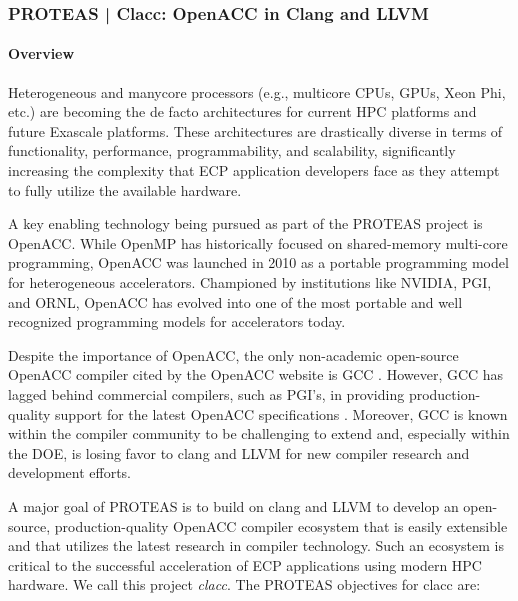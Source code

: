 \subsubsection{ PROTEAS | Clacc: OpenACC in Clang and LLVM}\label{s:clacc}

\newcommand{\todo}[1]{\textbf{\textcolor{red}{#1}}}

\paragraph{Overview}

Heterogeneous and manycore processors (e.g., multicore CPUs, GPUs, Xeon Phi,
etc.) are becoming the de facto architectures for current HPC platforms and
future Exascale platforms.  These architectures are drastically diverse in
terms of functionality, performance, programmability, and scalability,
significantly increasing the complexity that ECP application developers face
as they attempt to fully utilize the available hardware.

A key enabling technology being pursued as part of the PROTEAS project is
OpenACC.  While OpenMP has historically focused on shared-memory multi-core
programming, OpenACC was launched in 2010 as a portable programming model
for heterogeneous accelerators.  Championed by institutions like NVIDIA,
PGI, and ORNL, OpenACC has evolved into one of the most portable and well
recognized programming models for accelerators today.

Despite the importance of OpenACC, the only non-academic open-source OpenACC
compiler cited by the OpenACC website is GCC \cite{openaccOrgTools}.
However, GCC has lagged behind commercial compilers, such as PGI's, in
providing production-quality support for the latest OpenACC specifications
\cite{openACCValidationSuite}.  Moreover, GCC is known within the compiler
community to be challenging to extend and, especially within the DOE, is
losing favor to clang and LLVM for new compiler research and development
efforts.

A major goal of PROTEAS is to build on clang and LLVM to develop an
open-source, production-quality OpenACC compiler ecosystem that is easily
extensible and that utilizes the latest research in compiler technology.
Such an ecosystem is critical to the successful acceleration of ECP
applications using modern HPC hardware.  We call this project \emph{clacc}.
The PROTEAS objectives for clacc are:

